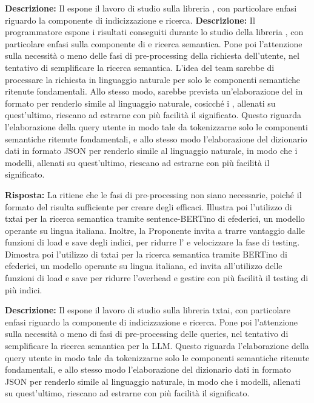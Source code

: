 \textbf{Descrizione:} Il  espone il lavoro di studio sulla libreria , con particolare enfasi riguardo la componente di indicizzazione e ricerca. 
\textbf{Descrizione:} Il programmatore espone i risultati conseguiti durante lo studio della libreria , con particolare enfasi sulla componente di  e ricerca semantica. 
Pone poi l'attenzione sulla necessità o meno delle fasi di pre-processing della richiesta dell'utente, nel tentativo di semplificare la ricerca semantica. 
L'idea del team sarebbe di processare la richiesta in linguaggio naturale per  solo le componenti semantiche ritenute fondamentali. Allo stesso modo, sarebbe prevista un'elaborazione del  in formato  per renderlo simile al linguaggio naturale, cosicché i , allenati su quest'ultimo, riescano ad estrarne con più facilità il significato.
Questo riguarda l'elaborazione della query utente in modo tale da tokenizzarne solo le componenti semantiche ritenute fondamentali, e allo stesso modo l'elaborazione del dizionario dati in formato JSON per renderlo simile al linguaggio naturale, in modo che i modelli, allenati su quest'ultimo, riescano ad estrarne con più facilità il significato.

\textbf{Risposta:} La  ritiene che le fasi di pre-processing non siano necessarie, poiché il formato del  risulta sufficiente per creare degli  efficaci. 
Illustra poi l'utilizzo di txtai per la ricerca semantica tramite sentence-BERTino di efederici, un modello operante su lingua italiana. Inoltre, la Proponente invita a trarre vantaggio dalle funzioni di load e save degli indici, per ridurre l' e velocizzare la fase di testing.
Dimostra poi l'utilizzo di txtai per la ricerca semantica tramite BERTino di efederici, un modello operante su lingua italiana, ed invita all'utilizzo delle funzioni di load e save per ridurre l'overhead e gestire con più facilità il testing di più indici.

\textbf{Descrizione:} Il  espone il lavoro di studio sulla libreria txtai, con particolare enfasi riguardo la componente di indicizzazione e ricerca. 
Pone poi l'attenzione sulla necessità o meno di fasi di pre-processing delle queries, nel tentativo di semplificare la ricerca semantica per la LLM. 
Questo riguarda l'elaborazione della query utente in modo tale da tokenizzarne solo le componenti semantiche ritenute fondamentali, e allo stesso modo l'elaborazione del dizionario dati in formato JSON per renderlo simile al linguaggio naturale, in modo che i modelli, allenati su quest'ultimo, riescano ad estrarne con più facilità il significato.

